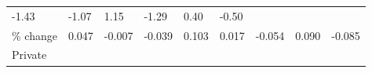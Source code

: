 \documentclass[
]{book}
\begin{document}
\begin{longtable}[]{@{}lllllllll@{}}
\begin{minipage}[t]{0.07\columnwidth}
-1.43\strut
\end{minipage} & \begin{minipage}[t]{0.06\columnwidth}\raggedright
-1.07\strut
\end{minipage} & \begin{minipage}[t]{0.11\columnwidth}\raggedright
1.15\strut
\end{minipage} & \begin{minipage}[t]{0.07\columnwidth}\raggedright
-1.29\strut
\end{minipage} & \begin{minipage}[t]{0.07\columnwidth}\raggedright
0.40\strut
\end{minipage} & \begin{minipage}[t]{0.10\columnwidth}\raggedright
-0.50\strut
\end{minipage}\tabularnewline
\begin{minipage}[t]{0.10\columnwidth}\raggedright
\% change\strut
\end{minipage} & \begin{minipage}[t]{0.08\columnwidth}\raggedright
0.047\strut
\end{minipage} & \begin{minipage}[t]{0.09\columnwidth}\raggedright
-0.007\strut
\end{minipage} & \begin{minipage}[t]{0.07\columnwidth}\raggedright
-0.039\strut
\end{minipage} & \begin{minipage}[t]{0.06\columnwidth}\raggedright
0.103\strut
\end{minipage} & \begin{minipage}[t]{0.11\columnwidth}\raggedright
0.017\strut
\end{minipage} & \begin{minipage}[t]{0.07\columnwidth}\raggedright
-0.054\strut
\end{minipage} & \begin{minipage}[t]{0.07\columnwidth}\raggedright
0.090\strut
\end{minipage} & \begin{minipage}[t]{0.10\columnwidth}\raggedright
-0.085\strut
\end{minipage}\tabularnewline
\begin{minipage}[t]{0.10\columnwidth}\raggedright
Private\strut
\end{minipage} & \begin{minipage}[t]{0.08\columnwidth}\raggedright
\strut
\end{minipage} & \begin{minipage}[t]{0.09\columnwidth}\raggedright

\end{minipage}
\end{longtable}
\end{document}
